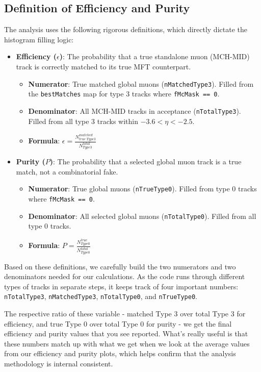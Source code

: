 \documentclass{article}
\begin{document}
\subsection{Definition of Efficiency and Purity}
The analysis uses the following rigorous definitions, which directly dictate the histogram filling logic:

\begin{itemize}
    \item \textbf{Efficiency ($\epsilon$)}: The probability that a true standalone muon (MCH-MID) track is correctly matched to its true MFT counterpart.
    \begin{itemize}
        \item \textbf{Numerator}: True matched global muons (\texttt{nMatchedType3}). Filled from the \texttt{bestMatches} map for type 3 tracks where \texttt{fMcMask == 0}.
        \item \textbf{Denominator}: All MCH-MID tracks in acceptance (\texttt{nTotalType3}). Filled from all type 3 tracks within $-3.6 < \eta < -2.5$.
        \item \textbf{Formula}: $\epsilon = \frac{N^{matched}_{true\ Type3}}{N^{total}_{Type3}}$
    \end{itemize}
    
    \item \textbf{Purity ($P$)}: The probability that a selected global muon track is a true match, not a combinatorial fake.
    \begin{itemize}
        \item \textbf{Numerator}: True global muons (\texttt{nTrueType0}). Filled from type 0 tracks where \texttt{fMcMask == 0}.
        \item \textbf{Denominator}: All selected global muons (\texttt{nTotalType0}). Filled from all type 0 tracks.
        \item \textbf{Formula}: $P = \frac{N^{true}_{Type0}}{N^{total}_{Type0}}$
    \end{itemize}
\end{itemize}

Based on these definitions, we carefully build the two numerators and two denominators needed for our calculations. As the code runs through different types of tracks in separate steps, it keeps track of four important numbers: \texttt{nTotalType3}, \texttt{nMatchedType3}, \texttt{nTotalType0}, and \texttt{nTrueType0}. 

The respective ratio of these variable - matched Type 3 over total Type 3 for efficiency, and true Type 0 over total Type 0 for purity - we get the final efficiency and purity values that you see reported. What's really useful is that these numbers match up with what we get when we look at the average values from our efficiency and purity plots, which helps confirm that the analysis methodology is internal consistent.
\end{document}
